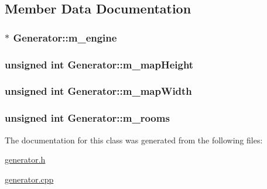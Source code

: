 \subsection{Member Data Documentation}
\hypertarget{classGenerator_a67bf71e434d74b280377b4f7acc3dc1d}{
\subsubsection[{m\-\_\-engine}]{$\ast$ Generator\-::m\-\_\-engine\hspace{0.3cm}{\ttfamily [private]}}}\label{classGenerator_a67bf71e434d74b280377b4f7acc3dc1d}
\hypertarget{classGenerator_a39fb4ca747e84f5422d313b4c57feb58}{
\subsubsection[{m\-\_\-map\-Height}]{\setlength{\rightskip}{0pt plus 5cm}unsigned int Generator\-::m\-\_\-map\-Height\hspace{0.3cm}{\ttfamily [private]}}}\label{classGenerator_a39fb4ca747e84f5422d313b4c57feb58}
\hypertarget{classGenerator_aab82506c17f83cef3b1449ee32760e4b}{
\subsubsection[{m\-\_\-map\-Width}]{\setlength{\rightskip}{0pt plus 5cm}unsigned int Generator\-::m\-\_\-map\-Width\hspace{0.3cm}{\ttfamily [private]}}}\label{classGenerator_aab82506c17f83cef3b1449ee32760e4b}
\hypertarget{classGenerator_ad1cdb1fdc53ea37a7652c505dfdda628}{
\subsubsection[{m\-\_\-rooms}]{\setlength{\rightskip}{0pt plus 5cm}unsigned int Generator\-::m\-\_\-rooms\hspace{0.3cm}{\ttfamily [private]}}}\label{classGenerator_ad1cdb1fdc53ea37a7652c505dfdda628}


The documentation for this class was generated from the following files\-:\begin{DoxyCompactItemize}
\item 
\hyperlink{generator_8h}{generator.\-h}\item 
\hyperlink{generator_8cpp}{generator.\-cpp}\end{DoxyCompactItemize}
